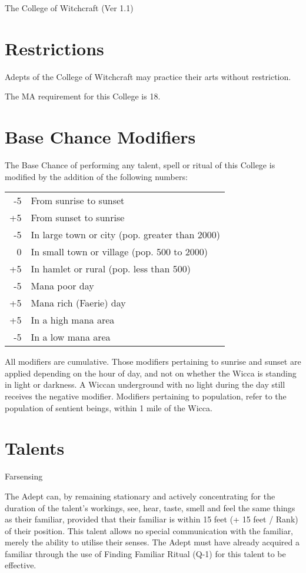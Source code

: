 \begin{Chapter}{The College of Witchcraft (Ver 1.1)}
\section{Restrictions}

Adepts  of  the  College  of  Witchcraft  may  practice 
their arts without restriction. 

The MA requirement for this College is 18. 


\section{Base Chance Modifiers}

The Base Chance of performing any talent, spell or 
ritual of this College is modified by the addition of 
the following numbers: 

\begin{tabularx}{\columnwidth}{rX}
-5	& From sunrise to sunset \\
+5	& From sunset to sunrise \\
-5	& In large town or city (pop. greater than 2000) \\
0	& In small town or village (pop. 500 to 2000) \\
+5	& In hamlet or rural (pop. less than 500)   \\
-5	& Mana poor day \\
+5	& Mana rich (Faerie) day \\
+5 	& In a high mana area \\
-5	& In a low mana area \\
\end{tabularx}

All modifiers are cumulative.  Those modifiers pertaining to sunrise
and sunset are applied depending on the hour of day, and not on
whether the Wicca is standing in light or darkness.  A Wiccan
underground with no light during the day still receives the negative
modifier.  Modifiers pertaining to population, refer to the population
of sentient beings, within 1 mile of the Wicca.


\section{Talents}

\begin{talent}[T-1]{Farsensing}
\begin{effects}
The Adept can, by remaining stationary and actively concentrating for
the duration of the talent’s workings, see, hear, taste, smell and
feel the same things as their familiar, provided that their familiar
is within 15 feet (+ 15 feet / Rank) of their position.  This talent
allows no special communication with the familiar, merely the ability
to utilise their senses.  The Adept must have already acquired a
familiar through the use of Finding Familiar Ritual (Q-1) for this
talent to be effective.


\end{effects}
\end{talent}
\end{Chapter}

